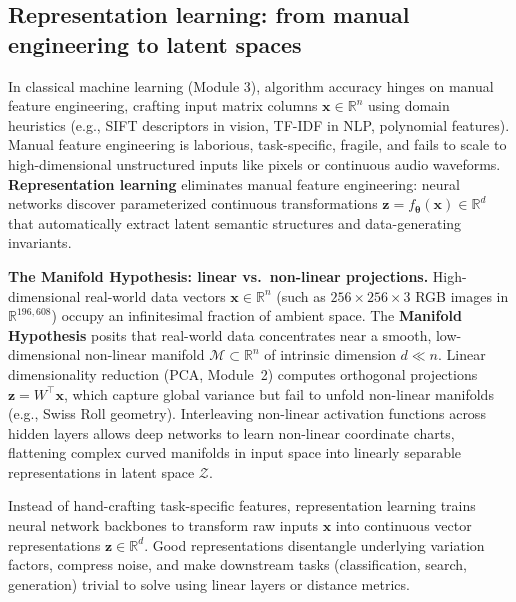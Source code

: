 \documentclass[11pt,a4paper]{article}
\begin{document}
	\begin{practicebox}

	\end{practicebox}
	
	\subsection{Representation learning: from manual engineering to latent spaces}
	
	In classical machine learning (Module 3), algorithm accuracy hinges on manual feature engineering, crafting input matrix columns $\mathbf{x} \in \mathbb{R}^n$ using domain heuristics (e.g., SIFT descriptors in vision, TF-IDF in NLP, polynomial features). Manual feature engineering is laborious, task-specific, fragile, and fails to scale to high-dimensional unstructured inputs like pixels or continuous audio waveforms. \textbf{Representation learning} \parencite{bengio2013} eliminates manual feature engineering: neural networks discover parameterized continuous transformations $\mathbf{z} = f_{\boldsymbol{\theta}}(\mathbf{x}) \in \mathbb{R}^d$ that automatically extract latent semantic structures and data-generating invariants.
	
	\textbf{The Manifold Hypothesis: linear vs.\ non-linear projections.} High-dimensional real-world data vectors $\mathbf{x} \in \mathbb{R}^n$ (such as $256 \times 256 \times 3$ RGB images in $\mathbb{R}^{196,608}$) occupy an infinitesimal fraction of ambient space. The \textbf{Manifold Hypothesis} posits that real-world data concentrates near a smooth, low-dimensional non-linear manifold $\mathcal{M} \subset \mathbb{R}^n$ of intrinsic dimension $d \ll n$. Linear dimensionality reduction (PCA, Module~2) computes orthogonal projections $\mathbf{z} = W^{\!\top}\mathbf{x}$, which capture global variance but fail to unfold non-linear manifolds (e.g., Swiss Roll geometry). Interleaving non-linear activation functions across hidden layers allows deep networks to learn non-linear coordinate charts, flattening complex curved manifolds in input space into linearly separable representations in latent space $\mathcal{Z}$.
	
	\begin{keyconcept}
		Instead of hand-crafting task-specific features, representation learning trains neural network backbones to transform raw inputs $\mathbf{x}$ into continuous vector representations $\mathbf{z} \in \mathbb{R}^d$. Good representations disentangle underlying variation factors, compress noise, and make downstream tasks (classification, search, generation) trivial to solve using linear layers or distance metrics.
	\end{keyconcept}
	
\end{document}
